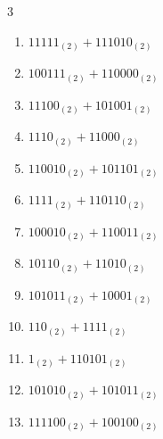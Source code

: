 \begin{multicols}{3}
\begin{enumerate}

  \item $11111_{(2)} + 111010_{(2)}$


  \item $100111_{(2)} + 110000_{(2)}$


  \item $11100_{(2)} + 101001_{(2)}$


  \item $1110_{(2)} + 11000_{(2)}$


\columnbreak %

  \item $110010_{(2)} + 101101_{(2)}$


  \item $1111_{(2)} + 110110_{(2)}$


  \item $100010_{(2)} + 110011_{(2)}$


  \item $10110_{(2)} + 11010_{(2)}$


  \item $101011_{(2)} + 10001_{(2)}$


  \item $110_{(2)} + 1111_{(2)}$


  \item $1_{(2)} + 110101_{(2)}$


  \item $101010_{(2)} + 101011_{(2)}$


  \item $111100_{(2)} + 100100_{(2)}$



\end{enumerate}
\end{multicols}
